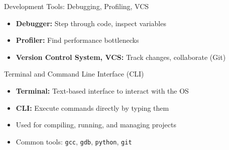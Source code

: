 \documentclass[12pt, aspectratio=169]{beamer}
\begin{document}
    \begin{frame}{Development Tools: Debugging, Profiling, VCS}
        \begin{itemize}
            \item \textbf{Debugger:} Step through code, inspect variables
            \item \textbf{Profiler:} Find performance bottlenecks
            \item \textbf{Version Control System, VCS:} Track changes, collaborate (Git)
        \end{itemize}
    \end{frame}


    \begin{frame}{Terminal and Command Line Interface (CLI)}
        \begin{itemize}
            \item \textbf{Terminal:} Text-based interface to interact with the OS
            \item \textbf{CLI:} Execute commands directly by typing them
            \item Used for compiling, running, and managing projects
            \item Common tools: \texttt{gcc}, \texttt{gdb}, \texttt{python}, \texttt{git}
        \end{itemize}
    \end{frame}
\end{document}
